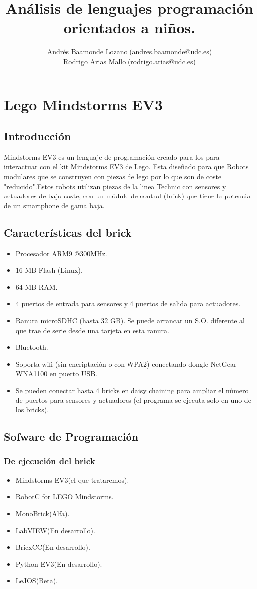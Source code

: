 \documentclass[12pt,a4paper]{article}
\title{Análisis de lenguajes programación orientados a niños.}
\author{Andrés Baamonde Lozano (andres.baamonde@udc.es)\\
	Rodrigo Arias Mallo (rodrigo.arias@udc.es)}
\begin{document}
\maketitle

\section{Lego Mindstorms EV3}
\subsection{Introducción}
   Mindstorms EV3 es un lenguaje de programación creado para los para interactuar con el kit Mindstorms EV3 de Lego. Esta diseñado para que Robots modulares que se construyen con piezas de lego por lo que son de coste "reducido".Estos robots utilizan piezas de la linea Technic con sensores y actuadores de bajo coste, con un módulo de control (brick) que tiene la potencia de un smartphone de gama baja.
  \subsection{Características del brick}
  \begin{itemize}
  \item Procesador ARM9 @300MHz.
  \item 16 MB Flash (Linux).
  \item 64 MB RAM.
  \item 4 puertos de entrada para sensores y 4 puertos de salida para actuadores.
  \item Ranura microSDHC (hasta 32 GB). Se puede arrancar un S.O. diferente al que trae de
  serie desde una tarjeta en esta ranura.
  \item Bluetooth.
  \item Soporta wifi (sin encriptación o con WPA2) conectando dongle NetGear WNA1100 en
  puerto USB.
  \item Se pueden conectar hasta 4 bricks en daisy chaining para ampliar el número de puertos
  para sensores y actuadores (el programa se ejecuta solo en uno de los bricks).
  \end{itemize}
  \subsection{Sofware de Programación}
  \subsubsection{De ejecución del brick}
    \begin{itemize}
    \item Mindstorms EV3(el que trataremos).
    \item RobotC for LEGO Mindstorms.
    \item MonoBrick(Alfa).
    \item LabVIEW(En desarrollo).
    \item BricxCC(En desarrollo).
    \item Python EV3(En desarrollo).
    \item LeJOS(Beta).
    \end{itemize}
\end{document}
